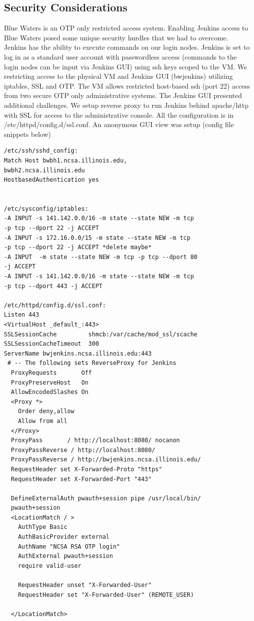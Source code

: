 \documentclass[10pt, conference, compsocconf]{IEEEtran}
\begin{document}
\subsection{Security Considerations}
Blue Waters is an OTP only restricted access system. Enabling Jenkins access to Blue Waters posed some unique security hurdles that we had to overcome. Jenkins has the ability to execute commands on our login nodes. Jenkins is set to log in as a standard user account with passwordless access (commands to the login nodes can be input via Jenkins GUI) using ssh keys scoped to the VM. We restricting access to the physical VM and Jenkins GUI (bwjenkins) utilizing iptables, SSL and OTP. The VM allows restricted host-based ssh (port 22) access from two secure OTP only administrative systems. The Jenkins GUI presented additional challenges. We setup reverse proxy to run Jenkins behind apache/http with SSL for access to the administrative console. All the configuration is in /etc/httpd/config.d/ssl.conf. An anonymous GUI view was setup (config file snippets below)

\begin{lstlisting}
/etc/ssh/sshd_config:
Match Host bwbh1.ncsa.illinois.edu,
bwbh2.ncsa.illinois.edu
HostbasedAuthentication yes


/etc/sysconfig/iptables:
-A INPUT -s 141.142.0.0/16 -m state --state NEW -m tcp 
-p tcp --dport 22 -j ACCEPT
-A INPUT -s 172.16.0.0/15 -m state --state NEW -m tcp 
-p tcp --dport 22 -j ACCEPT *delete maybe*
-A INPUT  -m state --state NEW -m tcp -p tcp --dport 80 
-j ACCEPT
-A INPUT -s 141.142.0.0/16 -m state --state NEW -m tcp 
-p tcp --dport 443 -j ACCEPT

/etc/httpd/config.d/ssl.conf:
Listen 443
<VirtualHost _default_:443>
SSLSessionCache         shmcb:/var/cache/mod_ssl/scache
SSLSessionCacheTimeout  300
ServerName bwjenkins.ncsa.illinois.edu:443
 # -- The following sets ReverseProxy for Jenkins
  ProxyRequests       Off
  ProxyPreserveHost   On
  AllowEncodedSlashes On
  <Proxy *>
    Order deny,allow
    Allow from all
  </Proxy>
  ProxyPass       / http://localhost:8080/ nocanon
  ProxyPassReverse / http://localhost:8080/
  ProxyPassReverse / http://bwjenkins.ncsa.illinois.edu/
  RequestHeader set X-Forwarded-Proto "https"
  RequestHeader set X-Forwarded-Port "443"

  DefineExternalAuth pwauth+session pipe /usr/local/bin/
  pwauth+session
  <LocationMatch / > 
    AuthType Basic
    AuthBasicProvider external
    AuthName "NCSA RSA OTP login" 
    AuthExternal pwauth+session
    require valid-user
    
    RequestHeader unset "X-Forwarded-User"
    RequestHeader set "X-Forwarded-User" (REMOTE_USER)

  </LocationMatch>
\end{lstlisting}
\end{document}
